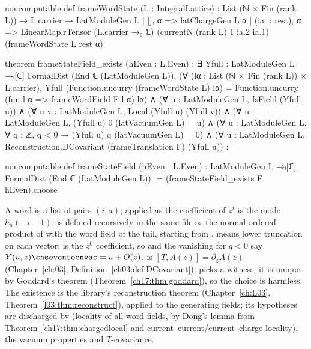 \begin{leancode}
noncomputable def frameWordState (L : IntegralLattice) : List (ℕ × Fin (rank L)) → L.carrier → LatModuleGen L
  | [], α => latChargeGen L α
  | (ia :: rest), α =>
      LinearMap.rTensor (L.carrier →₀ ℂ) (currentN (rank L) 1 ia.2 ia.1) (frameWordState L rest α)

theorem frameStateField_exists (hEven : L.Even)  :
    ∃ Yfull : LatModuleGen L →ₗ[ℂ] FormalDist (End ℂ (LatModuleGen L)),
      (∀ (lα : List (ℕ × Fin (rank L)) × L.carrier),
        Yfull (Function.uncurry (frameWordState L) lα)
          = Function.uncurry (fun l α => frameWordField F l α) lα) ∧
      (∀ u : LatModuleGen L, IsField (Yfull u)) ∧
      (∀ u v : LatModuleGen L, Local (Yfull u) (Yfull v)) ∧
      (∀ u : LatModuleGen L, (Yfull u) 0 (latVacuumGen L) = u) ∧
      (∀ u : LatModuleGen L, ∀ q : ℤ, q < 0 → (Yfull u) q (latVacuumGen L) = 0) ∧
      (∀ u : LatModuleGen L, Reconstruction.DCovariant (frameTranslation F) (Yfull u)) :=

noncomputable def frameStateField (hEven : L.Even)  :
    LatModuleGen L →ₗ[ℂ] FormalDist (End ℂ (LatModuleGen L)) :=
  (frameStateField_exists F hEven).choose
\end{leancode}

\begin{dictionary}
A word is a list of pairs $(i,a)$;  applied as the coefficient of $z^i$ is the mode
$h_a(-i-1)$.   is defined recursively in the same file as the normal-ordered
product of  with the word field of the tail, starting from
.   means lower truncation on each vector;
 is the $z^0$ coefficient, so  and the vanishing for
$q<0$ say $Y(u,z)\chseventeenvac=u+O(z)$.   is $[T,A(z)]=\partial_zA(z)$ (Chapter~\ref{ch:03},
Definition~\ref{ch03:def:DCovariant}).   picks a witness; it is unique by Goddard's theorem
(Theorem~\ref{ch17:thm:goddard}), so the choice is harmless.  The existence is the library's reconstruction
theorem  (Chapter~\ref{ch:L03}, Theorem~\ref{l03:thm:reconstruct}), applied
to the generating fields; its hypotheses are discharged by  (locality of all word
fields, by Dong's lemma from Theorem~\ref{ch17:thm:chargedlocal} and current--current/current--charge
locality), the vacuum properties and $T$-covariance.
\end{dictionary}

